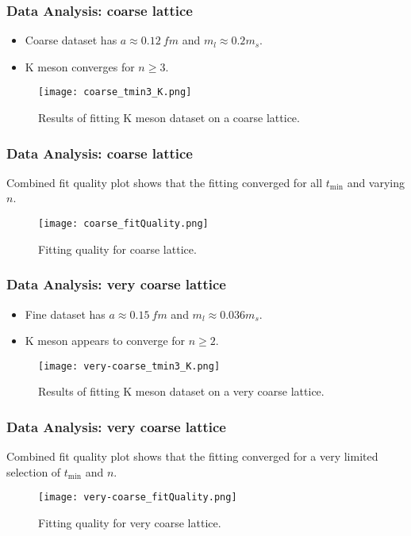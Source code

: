 \documentclass{beamer}
\begin{document}
\begin{frame}
    \frametitle{Data Analysis: coarse lattice}
    \begin{itemize}
        \item Coarse dataset has $a \approx \SI{0.12}{fm}$ and $m_l \approx 0.2 m_s$.
        \item K meson converges for $n \geq 3$.
    \end{itemize}
    \begin{figure}
        \centering
        \texttt{[image: coarse\_tmin3\_K.png]}
        \caption{Results of fitting K meson dataset on a coarse lattice.}
    \end{figure}
\end{frame}

\begin{frame}
    \frametitle{Data Analysis: coarse lattice}
    Combined fit quality plot shows that the fitting converged for all $t_\mathrm{min}$ and varying $n$.
    \begin{figure}
        \centering
        \texttt{[image: coarse\_fitQuality.png]}
        \caption{Fitting quality for coarse lattice.}
    \end{figure}
\end{frame}

\begin{frame}
    \frametitle{Data Analysis: very coarse lattice}
    \begin{itemize}
        \item Fine dataset has $a \approx \SI{0.15}{fm}$ and $m_l \approx 0.036 m_s$.
        \item K meson appears to converge for $n \geq 2$.
    \end{itemize}
    \begin{figure}
        \centering
        \texttt{[image: very-coarse\_tmin3\_K.png]}
        \caption{Results of fitting K meson dataset on a very coarse lattice.}
    \end{figure}
\end{frame}

\begin{frame}
    \frametitle{Data Analysis: very coarse lattice}
    Combined fit quality plot shows that the fitting converged for a very limited selection of $t_\mathrm{min}$ and $n$.
    \begin{figure}
        \centering
        \texttt{[image: very-coarse\_fitQuality.png]}
        \caption{Fitting quality for very coarse lattice.}
    \end{figure}
\end{frame}
\end{document}
